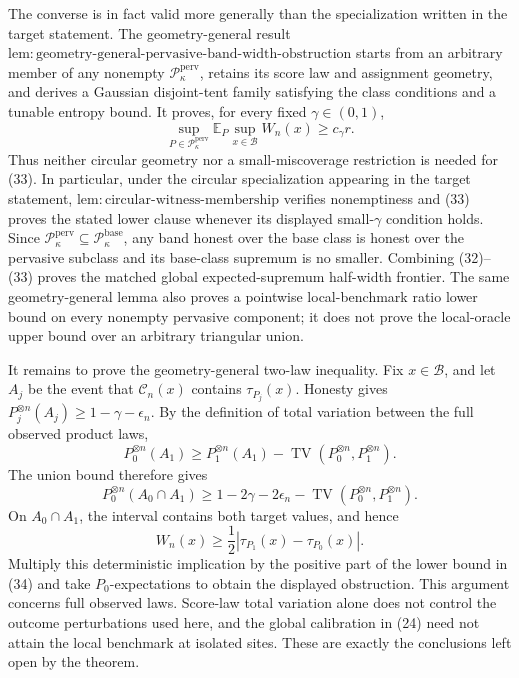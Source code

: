 The converse is in fact valid more generally than the specialization written in the target statement. The geometry-general result \(\mathrm{lem:geometry\text{-}general\text{-}pervasive\text{-}band\text{-}width\text{-}obstruction}\) starts from an arbitrary member of any nonempty \(\mathcal P_{\kappa}^{\mathrm{perv}}\), retains its score law and assignment geometry, and derives a Gaussian disjoint-tent family satisfying the class conditions and a tunable entropy bound. It proves, for every fixed \(\gamma\in(0,1)\),
\[
 \sup_{P\in\mathcal P_{\kappa}^{\mathrm{perv}}}
 \mathbb E_P\sup_{x\in\mathcal B}W_n(x)
 \ge c_\gamma r. \tag{33}
\]
Thus neither circular geometry nor a small-miscoverage restriction is needed for (33). In particular, under the circular specialization appearing in the target statement, \(\mathrm{lem:circular\text{-}witness\text{-}membership}\) verifies nonemptiness and (33) proves the stated lower clause whenever its displayed small-\(\gamma\) condition holds. Since \(\mathcal P_{\kappa}^{\mathrm{perv}}\subseteq\mathcal P_{\kappa}^{\mathrm{base}}\), any band honest over the base class is honest over the pervasive subclass and its base-class supremum is no smaller. Combining (32)--(33) proves the matched global expected-supremum half-width frontier. The same geometry-general lemma also proves a pointwise local-benchmark ratio lower bound on every nonempty pervasive component; it does not prove the local-oracle upper bound over an arbitrary triangular union.

It remains to prove the geometry-general two-law inequality. Fix \(x\in\mathcal B\), and let \(A_j\) be the event that \(\mathcal C_n(x)\) contains \(\tau_{P_j}(x)\). Honesty gives \(P_j^{\otimes n}(A_j)\ge1-\gamma-\epsilon_n\). By the definition of total variation between the full observed product laws,
\[
 P_0^{\otimes n}(A_1)
 \ge P_1^{\otimes n}(A_1)
 -\operatorname{TV}(P_0^{\otimes n},P_1^{\otimes n}).
\]
The union bound therefore gives
\[
 P_0^{\otimes n}(A_0\cap A_1)
 \ge1-2\gamma-2\epsilon_n-
 \operatorname{TV}(P_0^{\otimes n},P_1^{\otimes n}). \tag{34}
\]
On \(A_0\cap A_1\), the interval contains both target values, and hence
\[
 W_n(x)\ge\frac12|\tau_{P_1}(x)-\tau_{P_0}(x)|.
\]
Multiply this deterministic implication by the positive part of the lower bound in (34) and take \(P_0\)-expectations to obtain the displayed obstruction. This argument concerns full observed laws. Score-law total variation alone does not control the outcome perturbations used here, and the global calibration in (24) need not attain the local benchmark at isolated sites. These are exactly the conclusions left open by the theorem.